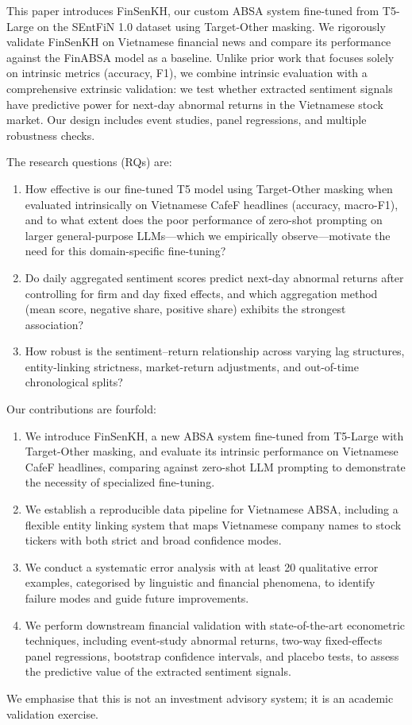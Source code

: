 \documentclass[12pt,a4paper]{article}
\begin{document}
This paper introduces FinSenKH, our custom ABSA system fine-tuned from T5-Large on the SEntFiN 1.0 dataset using Target-Other masking. We rigorously validate FinSenKH on Vietnamese financial news and compare its performance against the FinABSA model \cite{son2023removing} as a baseline. Unlike prior work that focuses solely on intrinsic metrics (accuracy, F1), we combine intrinsic evaluation with a comprehensive extrinsic validation: we test whether extracted sentiment signals have predictive power for next-day abnormal returns in the Vietnamese stock market. Our design includes event studies, panel regressions, and multiple robustness checks.

The research questions (RQs) are:
\begin{enumerate}[label=RQ\arabic*:, leftmargin=1.5cm]
    \item How effective is our fine-tuned T5 model using Target-Other masking when evaluated intrinsically on Vietnamese CafeF headlines (accuracy, macro-F1), and to what extent does the poor performance of zero-shot prompting on larger general-purpose LLMs—which we empirically observe—motivate the need for this domain-specific fine-tuning?
    \item Do daily aggregated sentiment scores predict next-day abnormal returns after controlling for firm and day fixed effects, and which aggregation method (mean score, negative share, positive share) exhibits the strongest association?
    \item How robust is the sentiment--return relationship across varying lag structures, entity-linking strictness, market-return adjustments, and out-of-time chronological splits?
\end{enumerate}

Our contributions are fourfold:
\begin{enumerate}
    \item We introduce FinSenKH, a new ABSA system fine-tuned from T5-Large with Target-Other masking, and evaluate its intrinsic performance on Vietnamese CafeF headlines, comparing against zero-shot LLM prompting to demonstrate the necessity of specialized fine-tuning.
    \item We establish a reproducible data pipeline for Vietnamese ABSA, including a flexible entity linking system that maps Vietnamese company names to stock tickers with both strict and broad confidence modes.
    \item We conduct a systematic error analysis with at least 20 qualitative error examples, categorised by linguistic and financial phenomena, to identify failure modes and guide future improvements.
    \item We perform downstream financial validation with state-of-the-art econometric techniques, including event-study abnormal returns, two-way fixed-effects panel regressions, bootstrap confidence intervals, and placebo tests, to assess the predictive value of the extracted sentiment signals.
\end{enumerate}
We emphasise that this is not an investment advisory system; it is an academic validation exercise.
\end{document}
